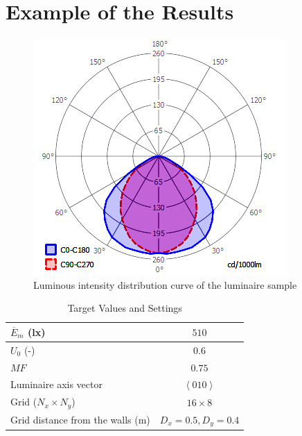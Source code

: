 \section{Example of the Results}

\begin{figure}[htb]
  \centering
  \includegraphics[width=0.7\columnwidth]{IDiag}
  \caption{Luminous intensity distribution curve of the luminaire sample}
  \label{fig:IDiag}
\end{figure}

\begin{table}[htb]
	\renewcommand{\arraystretch}{1.3}
	\caption{Target Values and Settings}
 	\label{tab:trgVal}
	\centering
  \begin{tabular}{| l | c |}
    \hline
    $\overline{E}_{m}$ (lx) & $510$ \\
    \hline
    $U_{0}$ (-) & $0.6$ \\
    \hline
		$MF$ & $0.75$ \\
    \hline
		Luminaire axis vector & $\left\langle 010\right\rangle$ \\
    \hline
		Grid ($N_x \times N_y$) & $16 \times 8$ \\
    \hline
		Grid distance from the walls (m) & $D_x=0.5, D_y=0.4$ \\
    \hline
  \end{tabular}
\end{table}

